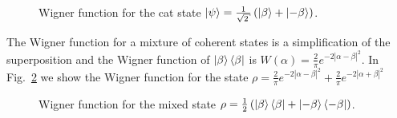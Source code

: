 \begin{homeworkProblem}
\begin{figure}[ht]
    \centering
    
    \caption{Wigner function for the cat state $ \ket{\psi} = \frac{1}{\sqrt{2}}
    \left( \ket{\beta} + \ket{-\beta} \right)$.}
    \label{fig:Problem5b}
\end{figure}

The Wigner function for a mixture of coherent states is a simplification of the
superposition and the Wigner function of $\ket{\beta}\bra{\beta}$
is $ W(\alpha) = \frac{2}{\pi} e^{-2 \left| \alpha - \beta \right|^2} $.
In Fig.~\ref{fig:Problem5b} we show the Wigner function for the state $ \rho =
\frac{2}{\pi} e^{-2 \left| \alpha - \beta \right|^2} + \frac{2}{\pi} e^{-2 \left| \alpha + \beta \right|^2} $
\begin{figure}[ht]
    \centering
    
    \caption{Wigner function for the mixed state $ \rho = \frac{1}{2}
    \left( \ket{\beta}\bra{\beta} + \ket{-\beta}\bra{-\beta} \right)$.}
    \label{fig:Problem5b}
\end{figure}
\end{homeworkProblem}
